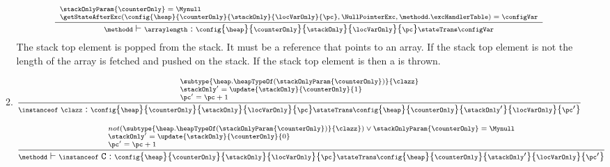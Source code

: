 \begin{itemize}
\begin{enumerate}
	 

	  $$ {\scriptsize	 \frac{ \begin{array}{l}
			       \stackOnlyParam{ \counterOnly } = \Mynull    \\
			        \getStateAfterExc( \config{\heap}{\counterOnly}{\stackOnly}{\locVarOnly}{\pc}, \NullPointerExc ,\methodd.\excHandlerTable ) =  \configVar  
			\end{array}
		      }
		      {\methodd \vdash \arraylength : \config{\heap}{\counterOnly}{\stackOnly}{\locVarOnly}{\pc} 
		                                      \stateTrans  
						      \configVar} } $$
	The stack top element is popped from the stack. It must be a 
	reference that points to an array. If the stack top element \stackOnlyParam{\counterOnly} is not \Mynull  the length of the array  
	\length{\stackOnlyParam{\counterOnly} } is fetched and pushed on the stack.
	If the stack top element \stackOnlyParam{\counterOnly} is \Mynull then a \NullPointerExc is thrown.


	\item \instanceof
	      $${\scriptsize \frac{ \begin{array}{l}
                            \subtype{\heap.\heapTypeOf(\stackOnlyParam{\counterOnly})}{\clazz}  \\	
			          \stackOnly' = \update{\stackOnly}{\counterOnly}{1}   \\
                 		  \pc' =  \pc +1 
			\end{array} 
	              }
                      {\instanceof  \ \clazz : \config{\heap}{\counterOnly}{\stackOnly}{\locVarOnly}{\pc} 
		                                   \stateTrans  
						   \config{\heap}{\counterOnly}{\stackOnly'}{\locVarOnly}{\pc'}} } $$
              
	      $$
	{\scriptsize	\frac{ \begin{array}{l}
                             not( \subtype{ \heap.\heapTypeOf( \stackOnlyParam{\counterOnly} ) }{\clazz}) \vee \stackOnlyParam{\counterOnly} = \Mynull  \\
			                \stackOnly' = \update{\stackOnly}{\counterOnly}{0}   \\
					\pc' =  \pc +1 
		        \end{array} }
		     {\methodd \vdash \instanceof  \ \tt{C} : \config{\heap}{\counterOnly}{\stackOnly}{\locVarOnly}{\pc} 
		                                   \stateTrans  
						   \config{\heap}{\counterOnly}{\stackOnly'}{\locVarOnly}{\pc'}}}  $$
		

\end{enumerate}
\end{itemize}
